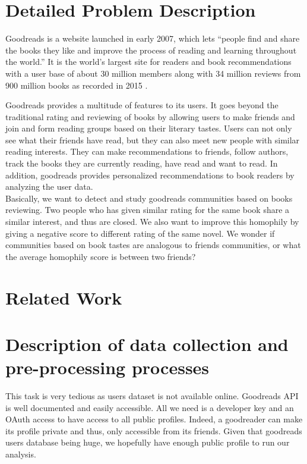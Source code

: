 \documentclass[11pt]{article}
\begin{document}
\maketitle


\section{Detailed Problem Description}
Goodreads is a website launched in early 2007, which lets ``people find and share the books they like and improve the process of reading and learning throughout the world.'' It is the world's largest site for readers and book recommendations with a user base of about 30 million members along with 34 million reviews from 900 million books as recorded in 2015 \cite{goodreads:aboutus}.

Goodreads provides a multitude of features to its users. It goes beyond the traditional rating and reviewing of books by allowing users to make friends and join and form reading groups based on their literary tastes.
Users can not only see what their friends have read, but they can also meet new people with similar reading interests. They can make recommendations to friends, follow authors, track the books they are currently reading, have read and want to read. In addition, goodreads provides personalized recommendations to book readers by analyzing the user data.\\

Basically, we want to detect and study goodreads communities based on books reviewing. Two people who has given similar rating for the same book share a similar interest, and thus are closed. We also want to improve this homophily by giving a negative score to different rating of the same novel.
We wonder if communities based on book tastes are analogous to friends communities, or what the average homophily score is between two friends?


\section{Related Work}


\section{Description of data collection and pre-processing processes}

This task is very tedious as users dataset is not available online. Goodreads API is well documented and easily accessible.
All we need is a developer key and an OAuth access to have access to all public profiles. Indeed, a goodreader can make its profile private and thus, only accessible from its friends. Given that goodreads users database being huge, we hopefully have enough public profile to run our analysis.
\end{document}
